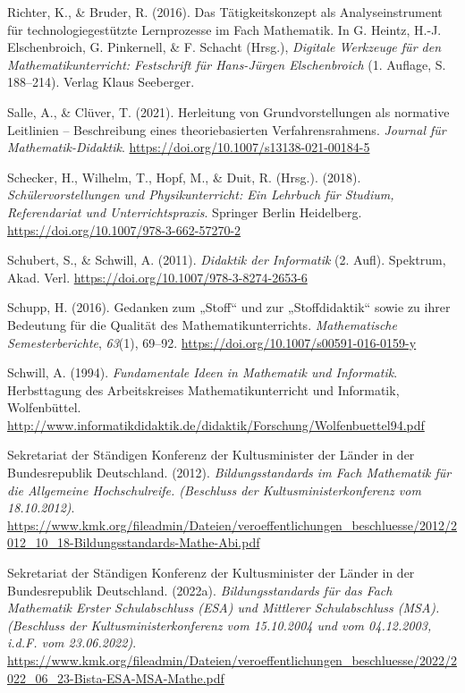 \documentclass[
]{scrbook}
\newlength{\cslhangindent}
\newenvironment{CSLReferences}[2] %
 {\begin{list}{}{%
  \setlength{\itemindent}{0pt}
  \setlength{\leftmargin}{0pt}
  \setlength{\parsep}{0pt}
  \ifodd #1
   \setlength{\leftmargin}{\cslhangindent}
   \setlength{\itemindent}{-1\cslhangindent}
  \fi
  \setlength{\itemsep}{#2\baselineskip}}}
 {\end{list}}
\theoremstyle{definition}
\theoremstyle{definition}
\theoremstyle{definition}
\theoremstyle{definition}
\theoremstyle{remark}
\begin{document}
\begin{CSLReferences}{1}{0}
Richter, K., \& Bruder, R. (2016). Das {Tätigkeitskonzept} als {Analyseinstrument} für technologiegestützte {Lernprozesse} im {Fach} {Mathematik}. In G. Heintz, H.-J. Elschenbroich, G. Pinkernell, \& F. Schacht (Hrsg.), \emph{Digitale {Werkzeuge} für den {Mathematikunterricht}: {Festschrift} für {Hans}-{Jürgen} {Elschenbroich}} (1. Auflage, S. 188--214). Verlag Klaus Seeberger.

Salle, A., \& Clüver, T. (2021). Herleitung von {Grundvorstellungen} als normative {Leitlinien} -- {Beschreibung} eines theoriebasierten {Verfahrensrahmens}. \emph{Journal für Mathematik-Didaktik}. \url{https://doi.org/10.1007/s13138-021-00184-5}

Schecker, H., Wilhelm, T., Hopf, M., \& Duit, R. (Hrsg.). (2018). \emph{Schülervorstellungen und {Physikunterricht}: {Ein} {Lehrbuch} für {Studium}, {Referendariat} und {Unterrichtspraxis}}. Springer Berlin Heidelberg. \url{https://doi.org/10.1007/978-3-662-57270-2}

Schubert, S., \& Schwill, A. (2011). \emph{Didaktik der {Informatik}} (2. Aufl). Spektrum, Akad. Verl. \url{https://doi.org/10.1007/978-3-8274-2653-6}

Schupp, H. (2016). Gedanken zum „{Stoff}`` und zur „{Stoffdidaktik}`` sowie zu ihrer {Bedeutung} für die {Qualität} des {Mathematikunterrichts}. \emph{Mathematische Semesterberichte}, \emph{63}(1), 69--92. \url{https://doi.org/10.1007/s00591-016-0159-y}

Schwill, A. (1994). \emph{Fundamentale {Ideen} in {Mathematik} und {Informatik}}. Herbsttagung des Arbeitskreises Mathematikunterricht und Informatik, Wolfenbüttel. \url{http://www.informatikdidaktik.de/didaktik/Forschung/Wolfenbuettel94.pdf}

Sekretariat der Ständigen Konferenz der Kultusminister der Länder in der Bundesrepublik Deutschland. (2012). \emph{Bildungsstandards im {Fach} {Mathematik} für die {Allgemeine} {Hochschulreife}. (Beschluss der Kultusministerkonferenz vom 18.10.2012)}. \url{https://www.kmk.org/fileadmin/Dateien/veroeffentlichungen_beschluesse/2012/2012_10_18-Bildungsstandards-Mathe-Abi.pdf}

Sekretariat der Ständigen Konferenz der Kultusminister der Länder in der Bundesrepublik Deutschland. (2022a). \emph{Bildungsstandards für das {Fach} {Mathematik} {Erster} {Schulabschluss} ({ESA}) und {Mittlerer} {Schulabschluss} ({MSA}). ({Beschluss} der {Kultusministerkonferenz} vom 15.10.2004 und vom 04.12.2003, i.d.{F}. vom 23.06.2022)}. \url{https://www.kmk.org/fileadmin/Dateien/veroeffentlichungen_beschluesse/2022/2022_06_23-Bista-ESA-MSA-Mathe.pdf}


\end{CSLReferences}
\end{document}
